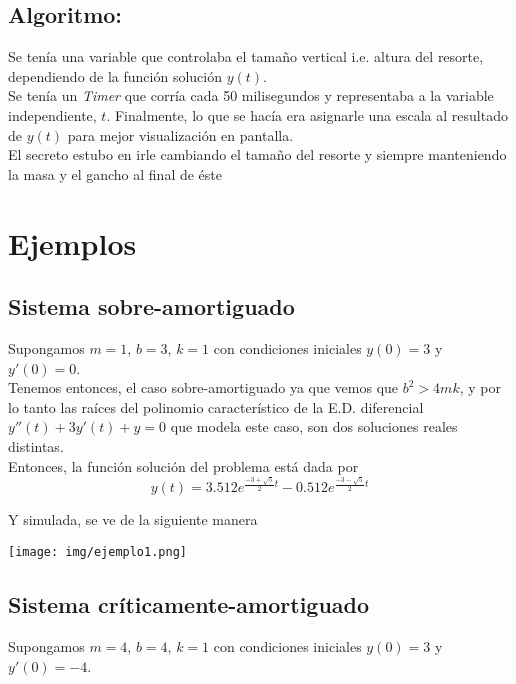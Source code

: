 \documentclass[11pt]{amsart}
\begin{document}
\subsection*{Algoritmo:} Se ten\'{i}a una variable que controlaba el tama\~{n}o vertical i.e. altura del resorte, dependiendo de la funci\'{o}n soluci\'{o}n $y(t)$. \\

Se ten\'{i}a un \textit{Timer} que corr\'{i}a cada 50 milisegundos y representaba a la variable independiente, $t$. Finalmente, lo que se hac\'{i}a era asignarle una escala al resultado de $y(t)$ para mejor visualizaci\'{o}n en pantalla. \\

El secreto estubo en irle cambiando el tama\~{n}o del resorte y siempre manteniendo la masa y el gancho al final de \'{e}ste

\section{Ejemplos}

\subsection{Sistema sobre-amortiguado}

Supongamos $m=1$, $b=3$, $k=1$ con condiciones iniciales $y(0) = 3$ y $y'(0) = 0$.\\

Tenemos entonces, el caso sobre-amortiguado ya que vemos que $b^2 > 4mk$, y por lo tanto las ra\'{i}ces del polinomio caracter\'{i}stico de la E.D. diferencial $y''(t) + 3y'(t) + y = 0$ que modela este caso, son dos soluciones reales distintas.\\

Entonces, la funci\'{o}n soluci\'{o}n del problema est\'{a} dada por
\[ y(t) = 3.512e^{\frac{-3+\sqrt{5}}{2}t} - 0.512e^{\frac{-3-\sqrt{5}}{2}t}\]

Y simulada, se ve de la siguiente manera
\begin{center}
\texttt{[image: img/ejemplo1.png]}
\end{center}

\subsection{Sistema cr\'{i}ticamente-amortiguado}

Supongamos $m=4$, $b=4$, $k=1$ con condiciones iniciales $y(0) = 3$ y $y'(0) = -4$.\\
\end{document}
